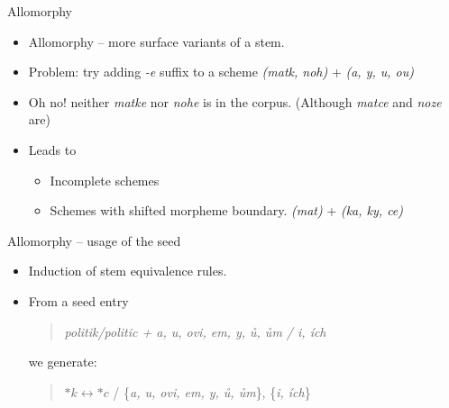 \documentclass[hyperref={pdfencoding=unicode, unicode=true}, xcolor=dvipsnames]{beamer}
\begin{document}
\begin{frame}{Allomorphy}
\begin{itemize}
\item Allomorphy -- more surface variants of a stem.
\item Problem: try adding \emph{-e} suffix to a scheme \emph{(matk, noh)} + \emph{(a, y, u, ou)}
\item Oh no! neither \emph{matke} nor \emph{nohe} is in the corpus. (Although \emph{matce} and \emph{noze} are)
\item Leads to \begin{itemize}
    \item Incomplete schemes
    \item Schemes with shifted morpheme boundary. \emph{(mat)} + \emph{(ka, ky, ce)}
\end{itemize}
\end{itemize}

\end{frame}

\begin{frame}{Allomorphy -- usage of the seed}
\begin{itemize}
\item Induction of stem equivalence rules.
\item From a seed entry 
\begin{quote}
\emph{politik/politic + a, u, ovi, em, y, ů, ům / i, ích}
\end{quote}
we generate:
\begin{quote}
$*k \leftrightarrow *c$ / \{\emph{a, u, ovi, em, y, ů, ům}\}, \{\emph{i, ích}\}
\end{quote}
\end{itemize}

\end{frame}
\end{document}
